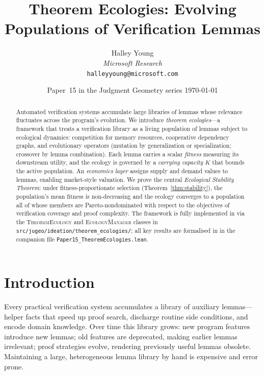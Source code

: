 \documentclass[11pt]{article}
\title{\textbf{Theorem Ecologies: Evolving Populations of Verification Lemmas}}
\author{%
  Halley Young\\
  \textit{Microsoft Research}\\
  \texttt{halleyyoung@microsoft.com}
}
\date{Paper~15 in the Judgment Geometry series \quad \today}
\providecommand{\Cap}{K}                    %
\providecommand{\EcoMgr}{\textsc{EcologyManager}} %
\providecommand{\EcoThm}{\textsc{TheoremEcology}}   %
\begin{document}
\maketitle

\begin{abstract}
Automated verification systems accumulate large libraries of lemmas
whose relevance fluctuates across the program's evolution.  We
introduce \emph{theorem ecologies}---a framework that treats a
verification library as a living population of lemmas subject to
ecological dynamics: competition for memory resources, cooperative
dependency graphs, and evolutionary operators (mutation by
generalization or specialization; crossover by lemma combination).
Each lemma carries a scalar \emph{fitness} measuring its downstream
utility, and the ecology is governed by a \emph{carrying capacity}
$\Cap$ that bounds the active population.  An \emph{economics layer}
assigns supply and demand values to lemmas, enabling market-style
valuation.  We prove the central \emph{Ecological Stability Theorem}:
under fitness-proportionate selection (Theorem~\ref{thm:stability}),
the population's mean fitness is non-decreasing and the ecology
converges to a population all of whose members are Pareto-nondominated
with respect to the objectives of verification coverage and proof
complexity.  The framework is fully implemented in \JuGeo{} via the
\EcoThm{} and \EcoMgr{} classes in
\texttt{src/jugeo/ideation/theorem\_ecologies/}; all key results are
formalised in \LEAN{} in the companion file
\texttt{Paper15\_TheoremEcologies.lean}.
\end{abstract}

\newpage

\section{Introduction}\label{sec:intro}

Every practical verification system accumulates a library of auxiliary
lemmas---helper facts that speed up proof search, discharge routine
side conditions, and encode domain knowledge.  Over time this library
grows: new program features introduce new lemmas; old features are
deprecated, making earlier lemmas irrelevant; proof strategies
evolve, rendering previously useful lemmas obsolete.  Maintaining a
large, heterogeneous lemma library by hand is expensive and error
prone.
\end{document}
